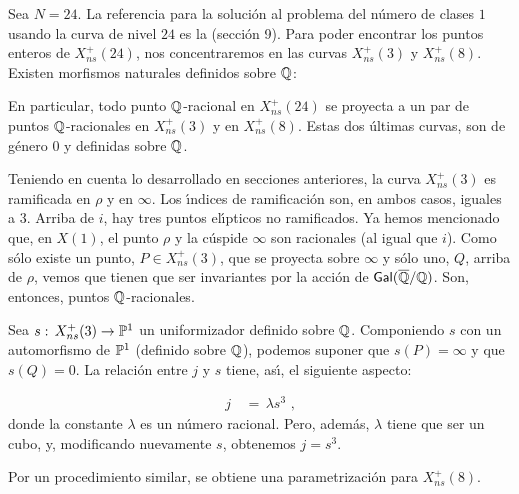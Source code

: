 
Sea $N=24$. La referencia para la soluci\'{o}n al problema del n\'{u}mero de
clases $1$ usando la curva de nivel $24$ es la \cite{booher} (secci\'{o}n 9).
Para poder encontrar los puntos enteros de $X_{ns}^{+}(24)$,
nos concentraremos en las curvas $X_{ns}^{+}(3)$ y $X_{ns}^{+}(8)$. Existen
morfismos naturales definidos sobre $\mathbb{Q}$:

\begin{center}
\end{center}
En particular, todo punto $\mathbb{Q}$-racional en $X_{ns}^{+}(24)$ se proyecta a un
par de puntos $\mathbb{Q}$-racionales en $X_{ns}^{+}(3)$ y en $X_{ns}^{+}(8)$. Estas
dos \'{u}ltimas curvas, %
son de g\'{e}nero $0$ y definidas sobre $\mathbb{Q}$.

Teniendo en cuenta lo desarrollado en secciones anteriores, la curva
$X_{ns}^{+}(3)$ es ramificada en $\rho$ y en $\infty$. Los \'{\i}ndices de
ramificaci\'{o}n son, en ambos casos, iguales a $3$. Arriba de $i$, hay tres
puntos el\'{\i}pticos no ramificados. Ya hemos mencionado que, en $X(1)$, el
punto $\rho$ y la c\'{u}spide $\infty$ son racionales (al igual que $i$).
Como s\'{o}lo existe un punto, $P\in X_{ns}^{+}(3)$, que se proyecta sobre $\infty$
y s\'{o}lo uno, $Q$, arriba de $\rho$, vemos que tienen que ser invariantes por
la acci\'{o}n de $\mathsf{Gal}(\overline{\mathbb{Q}}/\mathbb{Q})$. Son, entonces, puntos $\mathbb{Q}$-racionales.

Sea $s:\,X_{ns}^{+}(3)\rightarrow\mathbb{P}^{1}$ un uniformizador definido sobre
$\mathbb{Q}$. Componiendo $s$ con un automorfismo de $\mathbb{P}^{1}$
(definido sobre $\mathbb{Q}$), podemos suponer que $s(P)=\infty$ y que $s(Q)=0$.
La relaci\'{o}n entre $j$ y $s$ tiene, as\'{\i}, el siguiente aspecto:

\begin{align*}
 j & \,=\,\lambda s^{3}\text{ ,}
\end{align*}
donde la constante $\lambda$ es un n\'{u}mero racional. Pero, adem\'{a}s, $\lambda$
tiene que ser un cubo, y, modificando nuevamente $s$, obtenemos $j=s^{3}$.

Por un procedimiento similar, se obtiene una parametrizaci\'{o}n para
$X_{ns}^{+}(8)$.

